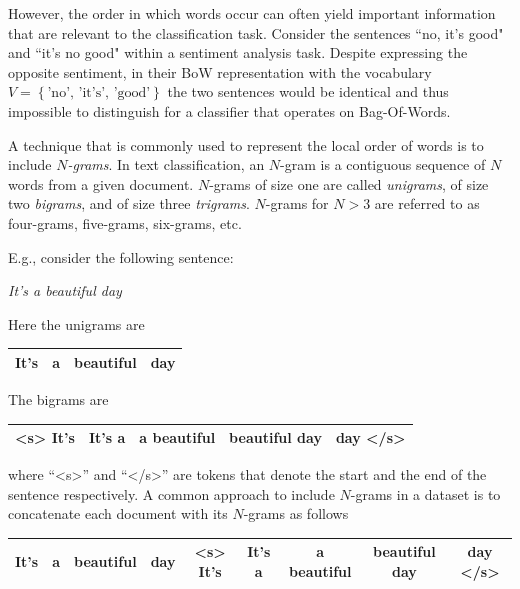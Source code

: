 However, the order in which words occur can often yield important information
that are relevant to the classification task. Consider the sentences ``no,
it's good" and ``it's no good" within a sentiment analysis task. Despite
expressing the opposite sentiment, in their BoW representation
with the vocabulary $V = \left\{\text{'no', 'it's', 'good'} \right\}$ 
the two sentences would be identical and thus impossible to distinguish for a
classifier that operates on Bag-Of-Words.

A technique that is commonly used to represent the local order
of words is to include \emph{$N$-grams}. In text classification, an $N$-gram is
a contiguous sequence of $N$ words from a given document. $N$-grams of size one are called
\emph{unigrams}, of size two \emph{bigrams}, and of size three \emph{trigrams}.
$N$-grams for $N > 3$ are referred to as four-grams, five-grams, six-grams, etc.

E.g., consider the following sentence:

\begin{center}
\textit{It's a beautiful day}
\end{center}

Here the unigrams are

\begin{center}
\begin{tabular}{|c|c|c|c|}
\hline
It's & a & beautiful & day \\
\hline
\end{tabular}
\end{center}

The bigrams are

\begin{center}
\begin{tabular}{|c|c|c|c|c|}
\hline
<s> It's & It's a & a beautiful & beautiful day & day </s> \\
\hline
\end{tabular}
\end{center}

where ``<s>'' and ``</s>'' are tokens that denote the start and the end of the
sentence respectively. 
A common approach to include $N$-grams in a dataset is
to concatenate each document with its $N$-grams as follows 

\begin{center}
\begin{tabular}{|c|c|c|c|c|c|c|c|c|}
\hline
It's & a & beautiful & day & <s> It's & It's a & a beautiful & beautiful day &

day </s> \\
\hline
\end{tabular}
\end{center}

